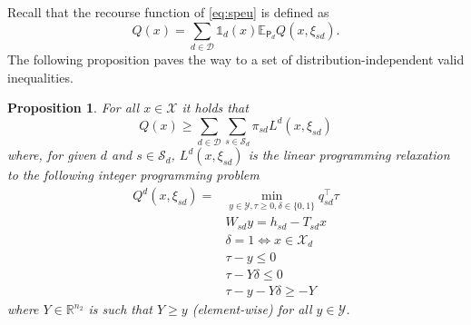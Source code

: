 \documentclass[12pt]{article}
\newtheorem{proposition}[theorem]{Proposition}%
\theoremstyle{thmstylethree}%
\newcommand{\mtc}[1] {\mathcal{#1}}
\newcommand{\pr}[1]{\ensuremath{\mathsf{#1}}}
\def\R{\ensuremath{\mathbb{R}}}
\def\Ex{\ensuremath{\mathbb{E}}}
\def\Ind{\ensuremath{\mathbb{1}}}
\begin{document}
Recall that the recourse function of \eqref{eq:speu} is defined as $$Q(x)=\sum_{d\in\mtc{D}}\Ind_d(x)\Ex_{\pr{P}_d}Q(x,\xi_{sd}).$$
The following proposition paves the way to a set of distribution-independent valid inequalities.

\begin{proposition}\label{prop:lpbound}
  For all $x\in\mtc{X}$ it holds that
  $$Q(x)\geq \sum_{d\in\mtc{D}}\sum_{s\in\mtc{S}_d}\pi_{sd}L^{d}(x,\xi_{sd})$$
  where, for given $d$ and $s\in \mtc{S}_d$, $L^{d}(x,\xi_{sd})$ is the linear programming relaxation to the following integer programming problem
  \begin{align*}Q^{d}(x,\xi_{sd})=&\min_{y\in\mtc{Y},\tau\geq 0,\delta\in\{0,1\}}q_{sd}^\top \tau\\
                                  & W_{sd}y=h_{sd}-T_{sd}x\\
                                  &\delta =1\iff x\in\mtc{X}_d\\
                                  &\tau-y \leq 0\\
                                  &\tau-Y\delta\leq 0\\
                                  &\tau-y-Y\delta\geq -Y
  \end{align*}
  where $Y\in \R^{n_2}$ is such that $Y\geq y$ (element-wise) for all $y\in\mtc{Y}$.
\end{proposition}
\end{document}
